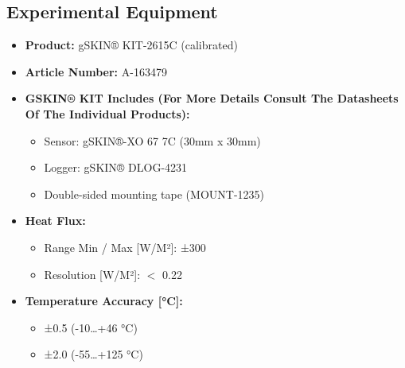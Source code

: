 

\begin{theappendices}


\chapter{Experimental Equipment}




\begin{table}[tbh]

\begin{framed}
    
\small
{}
\begin{itemize}
    \setlength\itemsep{-0.2em}
    \item \textbf{Product:} gSKIN® KIT-2615C (calibrated)
    \item \textbf{Article Number:} A-163479
    \item \textbf{GSKIN® KIT Includes (For More Details Consult The Datasheets Of The Individual Products):}
    \begin{itemize}
        \item Sensor: gSKIN®-XO 67 7C (30mm x 30mm)
        \item Logger: gSKIN® DLOG-4231
        \item Double-sided mounting tape (MOUNT-1235)
    \end{itemize}
    \item \textbf{Heat Flux:}
    \begin{itemize}
        \item Range Min / Max [W/M²]: ±300
        \item Resolution [W/M²]: $<$ 0.22
    \end{itemize}
    \item \textbf{Temperature Accuracy [°C]:}
    \begin{itemize}
        \item ±0.5 (-10…+46 °C)
        \item ±2.0 (-55…+125 °C)
    \end{itemize}
    

\end{itemize}
\end{framed}
\end{table}
\end{theappendices}
